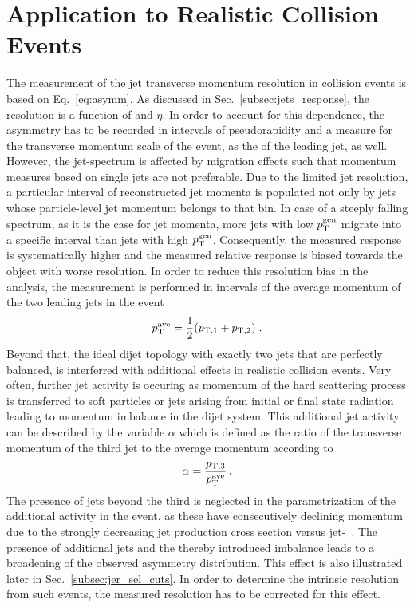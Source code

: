 \section{Application to Realistic Collision Events}
\label{sec:jer_application}
The measurement of the jet transverse momentum resolution in collision events is based on Eq.~\ref{eq:asymm}. As discussed in Sec.~\ref{subsec:jets_response}, the resolution is a function of \pt and $\eta$. In order to account for this dependence, the asymmetry has to be recorded in intervals of pseudorapidity and a measure for the transverse momentum scale of the event, as \eg the \pt of the leading jet, as well. However, the jet-\pt spectrum is affected by migration effects such that momentum measures based on single jets are not preferable. Due to the limited jet resolution, a particular interval of reconstructed jet momenta is populated not only by jets whose particle-level jet momentum belongs to that bin. In case of a steeply falling spectrum, as it is the case for jet momenta, more jets with low $p_{\text{T}}^\mathrm{gen}$ migrate into a specific interval than jets with high $p_{\text{T}}^\mathrm{gen}$. Consequently, the measured response is systematically higher and the measured relative response is biased towards the object with worse resolution. In order to reduce this resolution bias in the analysis, the measurement is performed in intervals of the average momentum of the two leading jets in the event
\begin{equation}
p^{\text{ave}}_{\text{T}} = \frac{1}{2}(p_\mathrm{T.1} + p_\mathrm{T,2}) \; .
\end{equation}
Beyond that, the ideal dijet topology with exactly two jets that are perfectly balanced, is interferred with additional effects in realistic collision events. Very often, further jet activity is occuring as momentum of the hard scattering process is transferred to soft particles or jets arising from initial or final state radiation leading to momentum imbalance in the dijet system. This additional jet activity can be described by the variable $\alpha$ which is defined as the ratio of the transverse momentum of the third jet to the average momentum according to
 \begin{equation}
\label{eq:alpha}
\alpha = \frac{p_\mathrm{T,3}}{p_{\text{T}}^\mathrm{ave}} \, .
\end{equation}
The presence of jets beyond the third is neglected in the parametrization of the additional activity in the event, as these have consecutively declining momentum due to the strongly decreasing jet production cross section versus jet-\pt~\cite{CMS-PAS-QCD-11-004}. The presence of additional jets and the thereby introduced imbalance leads to a broadening of the observed asymmetry distribution. This effect is also illustrated later in Sec.~\ref{subsec:jer_sel_cuts}. In order to determine the intrinsic resolution from such events, the measured resolution has to be corrected for this effect. \\
